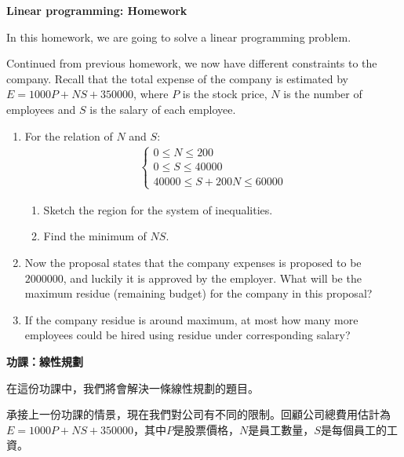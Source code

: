 \documentclass[12pt]{article}
\begin{document}
    \begin{center}
        \textbf{Linear programming: Homework}
    \end{center}

    In this homework, we are going to solve a linear programming problem.

    Continued from previous homework, we now have different constraints to the company. Recall that the total expense of the company is estimated by $E=1000P+NS+350000$, where $P$ is the stock price, $N$ is the number of employees and $S$ is the salary of each employee.

    \begin{enumerate}
        \item For the relation of $N$ and $S$:\begin{align*}
            \begin{cases}
                0\leq N\leq 200\\
                0\leq S\leq 40000\\
                40000\leq S+200N \leq 60000
            \end{cases}
        \end{align*}
        \begin{enumerate}
            \item Sketch the region for the system of inequalities.
            \item Find the minimum of $NS$.
        \end{enumerate}
        \item Now the proposal states that the company expenses is proposed to be $2000000$, and luckily it is approved by the employer. What will be the maximum residue (remaining budget) for the company in this proposal?
        \item If the company residue is around maximum, at most how many more employees could be hired using residue under corresponding salary?
    \end{enumerate}

    \newpage

    \begin{center}
        \textbf{功課：線性規劃}
    \end{center}

    在這份功課中，我們將會解決一條線性規劃的題目。

    承接上一份功課的情景，現在我們對公司有不同的限制。回顧公司總費用估計為 $E=1000P+NS+350000$，其中$P$是股票價格，$N$是員工數量，$S$是每個員工的工資。
\end{document}
